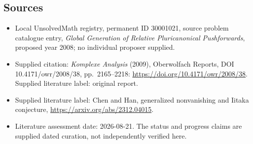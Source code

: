 \documentclass[11pt]{article}
\begin{document}
\subsection{Sources}
\begin{itemize}\item Local UnsolvedMath registry, permanent ID 30001021, source problem catalogue entry, \emph{Global Generation of Relative Pluricanonical Pushforwards}, proposed year 2008; no individual proposer supplied.\item Supplied citation: \emph{Komplexe Analysis} (2009), Oberwolfach Reports, DOI 10.4171/owr/2008/38, pp.\ 2165--2218: \url{https://doi.org/10.4171/owr/2008/38}. Supplied literature label: original report.\item Supplied literature label: Chen and Han, generalized nonvanishing and Iitaka conjecture, \url{https://arxiv.org/abs/2312.04015}.\item Literature assessment date: 2026-08-21. The status and progress claims are supplied dated curation, not independently verified here.\end{itemize}
\end{document}
